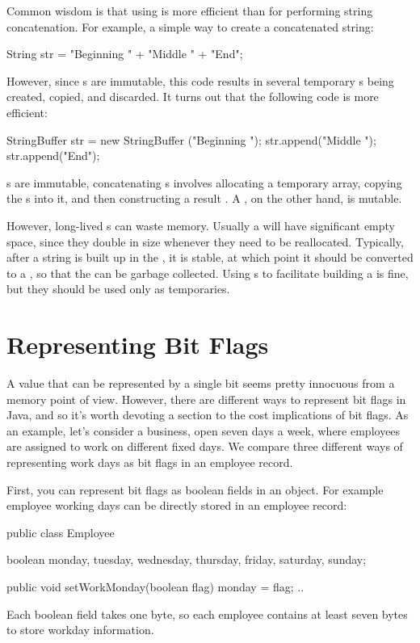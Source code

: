 Common wisdom is that using  is more efficient than
 for performing string concatenation. For example, a simple way
to create a concatenated string:
\begin{shortlisting}
	String str = "Beginning  " + "Middle " +  "End";
\end{shortlisting}
However, since s are immutable, this code results in several
temporary s being created, copied, and discarded.  It turns out
that the following code is more efficient:
\begin{shortlisting}
	StringBuffer str = new StringBuffer ("Beginning ");
	str.append("Middle ");
    str.append("End");
\end{shortlisting}
s are immutable, concatenating s involves allocating a temporary
 array, copying the s into it, and then constructing
a result . A , on the other hand, is mutable.

However, long-lived s can waste memory. Usually a
 will have significant empty space, since they double in
size whenever they need to be reallocated. Typically, after a string is built up in the
, it is stable, at which point it should be converted 
to a , so that the  can be
garbage collected. Using s to facilitate
building a  is fine, but they should be used only as temporaries.

\section{Representing Bit Flags}
\label{sec:bit-flags}

A value that can be represented by a single bit seems pretty innocuous from a
memory point of view. However, there are different ways to represent bit flags
in Java, and so it's worth devoting a section to the cost implications of
bit flags. As an example, let's consider a business, open seven days a
week, where employees are assigned to work on different fixed days.  We compare three
different ways of representing work days as bit flags in an employee record.
 
First, you can represent bit flags as boolean fields in an object. For example
employee working days can be directly stored in an employee record:
\begin{shortlisting}

    public class Employee {
    	boolean monday, tuesday, wednesday, thursday, friday, saturday, sunday;
    	
    	public void setWorkMonday(boolean flag) {
    		monday = flag;
    	}
    	..
    }
    
\end{shortlisting}
Each boolean field takes one byte, so each employee contains at least seven
bytes to store workday information. 

